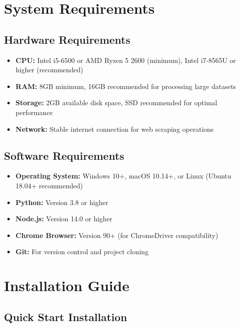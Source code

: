 \section{System Requirements}
\label{app:system_requirements}

\subsection{Hardware Requirements}

\begin{itemize}
\item \textbf{CPU:} Intel i5-6500 or AMD Ryzen 5 2600 (minimum), Intel i7-8565U or higher (recommended)
\item \textbf{RAM:} 8GB minimum, 16GB recommended for processing large datasets
\item \textbf{Storage:} 2GB available disk space, SSD recommended for optimal performance
\item \textbf{Network:} Stable internet connection for web scraping operations
\end{itemize}

\subsection{Software Requirements}

\begin{itemize}
\item \textbf{Operating System:} Windows 10+, macOS 10.14+, or Linux (Ubuntu 18.04+ recommended)
\item \textbf{Python:} Version 3.8 or higher
\item \textbf{Node.js:} Version 14.0 or higher
\item \textbf{Chrome Browser:} Version 90+ (for ChromeDriver compatibility)
\item \textbf{Git:} For version control and project cloning
\end{itemize}

\section{Installation Guide}
\label{app:installation_guide}

\subsection{Quick Start Installation}

